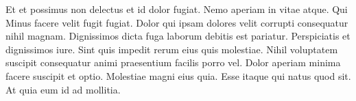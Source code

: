 \documentclass{article}
\begin{document}
    Et et possimus non delectus et id dolor fugiat. Nemo aperiam in
    vitae atque.  Qui  Minus facere velit fugit fugiat.
    Dolor qui ipsam dolores velit corrupti consequatur nihil
    magnam.   Dignissimos
    dicta fuga laborum debitis est pariatur.  Perspiciatis et
    dignissimos iure. Sint quis impedit rerum eius quis molestiae.
    Nihil voluptatem suscipit consequatur animi praesentium facilis
    porro vel. Dolor aperiam minima facere suscipit et optio.
    Molestiae magni eius quia. Esse itaque qui natus quod sit. At
    quia eum id ad mollitia.
\end{document}
